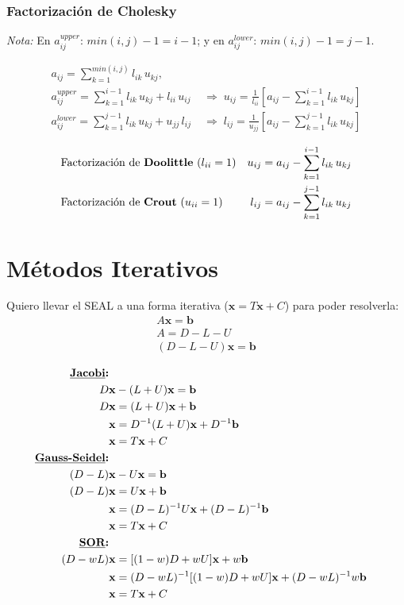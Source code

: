 \documentclass[10pt,a4paper]{article}
\begin{document}
\subsubsection{Factorización de Cholesky}
\textit{Nota:} En $a_{ij}^{upper}$: $min(i,j)-1 = i-1$; y en $a_{ij}^{lower}$: $min(i,j)-1 = j-1$.

\begin{align*}
& a_{ij} = \sum_{k=1}^{min(i,j)} l_{ik} \, u_{kj} ,& \\
& a_{ij}^{upper} = \sum_{k=1}^{i-1} l_{ik} \, u_{kj} + l_{ii} \, u_{ij}
&\; \Rightarrow \; u_{ij} = \frac{1}{l_{ii}}\left[ a_{ij} - \sum_{k=1}^{i-1} l_{ik} \, u_{kj} \right]& \\
& a_{ij}^{lower} = \sum_{k=1}^{j-1} l_{ik} \, u_{kj} + u_{jj} \, l_{ij}
&\; \Rightarrow \; l_{ij} = \frac{1}{u_{jj}}\left[ a_{ij} - \sum_{k=1}^{j-1} l_{ik} \, u_{kj} \right]& 
\end{align*}

\begin{align*}
&\text{Factorización de \textbf{Doolittle} ($l_{ii}=1$)}
& u_{ij} = a_{ij} - \sum_{k=1}^{i-1} l_{ik} \, u_{kj}& \\
&\text{Factorización de \textbf{Crout} ($u_{ii}=1$)}
& l_{ij} = a_{ij} - \sum_{k=1}^{j-1} l_{ik} \, u_{kj} & 
\end{align*}

\section{Métodos Iterativos}
Quiero llevar el SEAL a una forma iterativa ($\mathbf{x}=T\mathbf{x}+C$) para poder resolverla:
\begin{align*}
A\mathbf{x} = \mathbf{b} \\
A = D - L - U \\
(D - L - U) \mathbf{x} = \mathbf{b} 
\end{align*}

\begin{align*}
\text{\textbf{\underline{Jacobi}:}} \\
D&\mathbf{x} - (L + U)\mathbf{x} = \mathbf{b} \\
D&\mathbf{x} = (L + U)\mathbf{x} + \mathbf{b} \\
&\mathbf{x} = D^{-1}(L + U)\mathbf{x} + D^{-1}\mathbf{b} \\
&\mathbf{x} = T\mathbf{x} + C \\
\text{\textbf{\underline{Gauss-Seidel}:}} \\
(D-L)&\mathbf{x} - U\mathbf{x} = \mathbf{b} \\
(D-L)&\mathbf{x} = U\mathbf{x} + \mathbf{b} \\
&\mathbf{x} = (D-L)^{-1}U\mathbf{x} + (D-L)^{-1}\mathbf{b} \\
&\mathbf{x} = T\mathbf{x} + C \\
\text{\textbf{\underline{SOR}:}} \\
(D - wL) &\mathbf{x} = [(1-w)D + wU] \mathbf{x} + w \mathbf{b} \\
&\mathbf{x} = (D - wL)^{-1}[(1-w)D + wU] \mathbf{x} + (D - wL)^{-1}w \mathbf{b} \\
&\mathbf{x} = T\mathbf{x} + C 
\end{align*}
\end{document}
